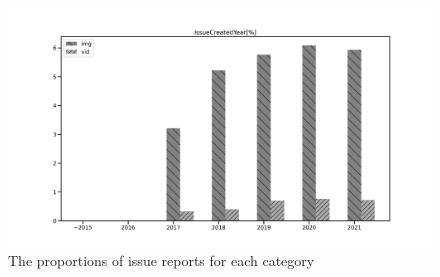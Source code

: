 
\begin{figure}[h]
\centering
\includegraphics[width=0.6\linewidth]{./figures/data-category-trend.pdf}
\caption{ 
  The proportions of issue reports for each category
  }
\label{fig:data-cat-trend}
\end{figure}
